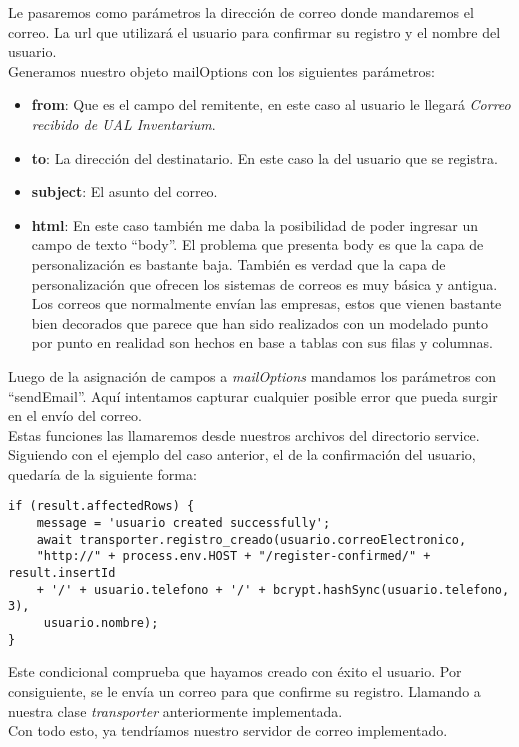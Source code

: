 Le pasaremos como parámetros la dirección de correo donde mandaremos el correo. La url que utilizará el usuario para confirmar su registro y el nombre del usuario.
\\Generamos nuestro objeto mailOptions con los siguientes parámetros:
\begin{itemize}
    \item \textbf{from}: Que es el campo del remitente, en este caso al usuario le llegará \textit{Correo recibido de UAL Inventarium}.
    \item \textbf{to}: La dirección del destinatario. En este caso la del usuario que se registra.
    \item \textbf{subject}: El asunto del correo.
    \item \textbf{html}: En este caso también me daba la posibilidad de poder ingresar un campo de texto ``body''. El problema que presenta body es que la capa de personalización es bastante baja. También es verdad que la capa de personalización que ofrecen los sistemas de correos es muy básica y antigua. Los correos que normalmente envían las empresas, estos que vienen bastante bien decorados que parece que han sido realizados con un modelado punto por punto en realidad son hechos en base a tablas con sus filas y columnas.
\end{itemize}
Luego de la asignación de campos a \textit{mailOptions} mandamos los parámetros con ``sendEmail''. Aquí intentamos capturar cualquier posible error que pueda surgir en el envío del correo.
\vspace{\baselineskip}
\\Estas funciones las llamaremos desde nuestros archivos del directorio service. Siguiendo con el ejemplo del caso anterior, el de la confirmación del usuario, quedaría de la siguiente forma:
\begin{verbatim}
if (result.affectedRows) {
    message = 'usuario created successfully';
    await transporter.registro_creado(usuario.correoElectronico, 
    "http://" + process.env.HOST + "/register-confirmed/" + result.insertId 
    + '/' + usuario.telefono + '/' + bcrypt.hashSync(usuario.telefono, 3),
     usuario.nombre);
}
\end{verbatim}
Este condicional comprueba que hayamos creado con éxito el usuario. Por consiguiente, se le envía un correo para que confirme su registro. Llamando a nuestra clase \textit{transporter} anteriormente implementada.
\\Con todo esto, ya tendríamos nuestro servidor de correo implementado.

